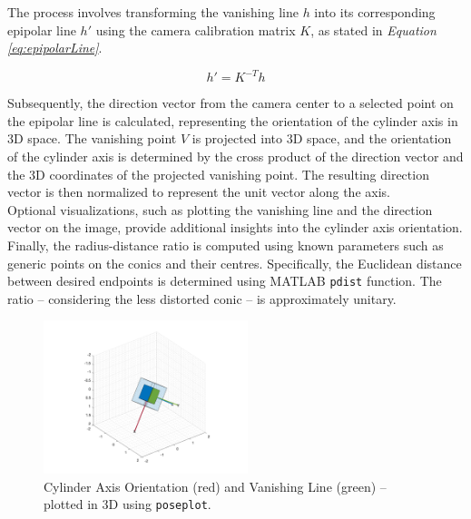 \documentclass[12pt,a4paper]{article}
\begin{document}
The process involves transforming the vanishing line $h$ into its corresponding epipolar line $h'$ using the camera calibration matrix $K$, as stated in \textit{Equation \ref{eq:epipolarLine}}.

\begin{equation}
    h' = K^{-T}h
    \label{eq:epipolarLine}
\end{equation}
\bigskip

Subsequently, the direction vector from the camera center to a selected point on the epipolar line is calculated, representing the orientation of the cylinder axis in 3D space. The vanishing point $V$ is projected into 3D space, and the orientation of the cylinder axis is determined by the cross product of the direction vector and the 3D coordinates of the projected vanishing point. The resulting direction vector is then normalized to represent the unit vector along the axis.\\

Optional visualizations, such as plotting the vanishing line and the direction vector on the image, provide additional insights into the cylinder axis orientation.\\

Finally, the radius-distance ratio is computed using known parameters such as generic points on the conics and their centres. Specifically, the Euclidean distance between desired endpoints is determined using MATLAB \verb|pdist| function. The ratio -- considering the less distorted conic --  is approximately unitary.

\begin{figure}[H]
    \centering
    \includegraphics[width=0.53\textwidth]{Images/axis_orientation.png}
    \cprotect\caption[Cylinder Axis Orientation.]{Cylinder Axis Orientation (red) and Vanishing Line (green) -- plotted in 3D using \verb|poseplot|.}
    \label{fig:axisImage}
\end{figure}

\pagebreak
\end{document}
